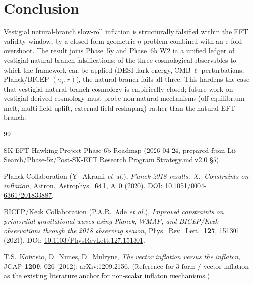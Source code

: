 \documentclass[twocolumn]{revtex4-2}
\newcommand{\nS}{n_s}
\newcommand{\rT}{r}
\begin{document}
\section{Conclusion}

Vestigial natural-branch slow-roll inflation is structurally falsified
within the EFT validity window, by a closed-form geometric $\eta$-problem
combined with an e-fold overshoot. The result joins Phase~5y and
Phase~6b W2 in a unified ledger of vestigial natural-branch
falsifications: of the three cosmological observables to which the
framework can be applied (DESI dark energy, CMB-$\ell$ perturbations,
Planck/BICEP $(\nS,\rT)$), the natural branch fails all three. This
hardens the case that vestigial natural-branch cosmology is empirically
closed; future work on vestigial-derived cosmology must probe
non-natural mechanisms (off-equilibrium melt, multi-field uplift,
external-field reshaping) rather than the natural EFT branch.


\begin{thebibliography}{99}

SK-EFT Hawking Project Phase 6b Roadmap (2026-04-24, prepared from
Lit-Search/Phase-5z/Post-SK-EFT Research Program Strategy.md v2.0
\S5).

Planck Collaboration (Y.~Akrami \emph{et~al.}),
\emph{Planck 2018 results.\ X.\ Constraints on inflation},
Astron.\ Astrophys.\ \textbf{641}, A10 (2020). DOI:
\href{https://doi.org/10.1051/0004-6361/201833887}{10.1051/0004-6361/201833887}.

BICEP/Keck Collaboration (P.A.R.\ Ade \emph{et~al.}),
\emph{Improved constraints on primordial gravitational waves using
Planck, WMAP, and BICEP/Keck observations through the 2018 observing
season},
Phys.\ Rev.\ Lett.\ \textbf{127}, 151301 (2021). DOI:
\href{https://doi.org/10.1103/PhysRevLett.127.151301}{10.1103/PhysRevLett.127.151301}.

T.S.~Koivisto, D.~Nunes, D.~Mulryne,
\emph{The vector inflation versus the inflaton},
JCAP \textbf{1209}, 026 (2012); arXiv:1209.2156. (Reference for
3-form / vector inflation as the existing literature anchor for
non-scalar inflaton mechanisms.)

\end{thebibliography}
\end{document}

